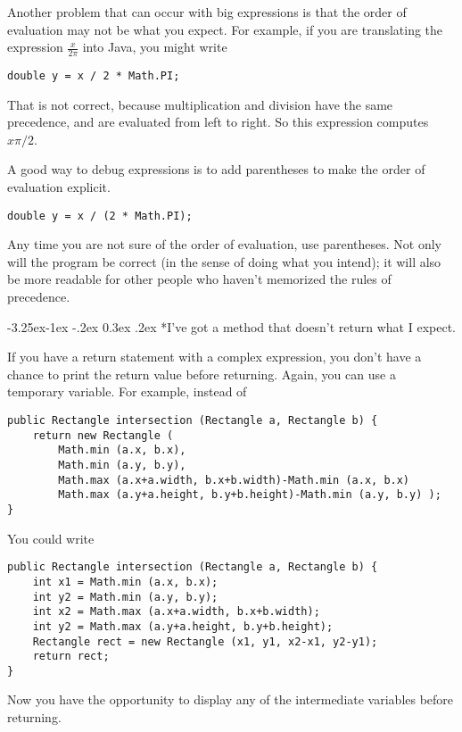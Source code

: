 \documentclass{book}
\makeatletter
\renewcommand\subsection{\@startsection {subsection}{2}{0mm}%
    {-3.25ex\@plus -1ex \@minus -.2ex}%
    {0.3ex \@plus .2ex}%
    {\normalfont\large\bfseries}}
\makeatother
\begin{document}

Another problem that can occur with big expressions is
that the order of evaluation may not be what you expect.
For example, if you are translating the expression
$\frac{x}{2 \pi}$ into Java, you might write

\begin{verbatim}
double y = x / 2 * Math.PI;
\end{verbatim}
%
That is not correct, because multiplication and division have
the same precedence, and are evaluated from left to right.
So this expression computes $x \pi / 2$.

A good way to debug expressions is to add parentheses to make
the order of evaluation explicit.

\begin{verbatim}
double y = x / (2 * Math.PI);
\end{verbatim}
%
Any time you are not sure of the order of evaluation, use
parentheses.  Not only will the program be correct (in the sense
of doing what you intend); it will also be more readable for
other people who haven't memorized the rules of precedence.



\subsection*{I've got a method that doesn't return what I
expect.}

If you have a return statement with a complex expression,
you don't have a chance to print the return value before
returning.  Again, you can use a temporary variable.  For
example, instead of

\begin{verbatim}
public Rectangle intersection (Rectangle a, Rectangle b) { 
    return new Rectangle (
        Math.min (a.x, b.x),
        Math.min (a.y, b.y),
        Math.max (a.x+a.width, b.x+b.width)-Math.min (a.x, b.x)
        Math.max (a.y+a.height, b.y+b.height)-Math.min (a.y, b.y) );
}
\end{verbatim}
%
You could write

\begin{verbatim}
public Rectangle intersection (Rectangle a, Rectangle b) { 
    int x1 = Math.min (a.x, b.x);
    int y2 = Math.min (a.y, b.y);
    int x2 = Math.max (a.x+a.width, b.x+b.width);
    int y2 = Math.max (a.y+a.height, b.y+b.height);
    Rectangle rect = new Rectangle (x1, y1, x2-x1, y2-y1);
    return rect;
}
\end{verbatim}
%
Now you have the opportunity to display any of
the intermediate variables before returning.
\end{document}
